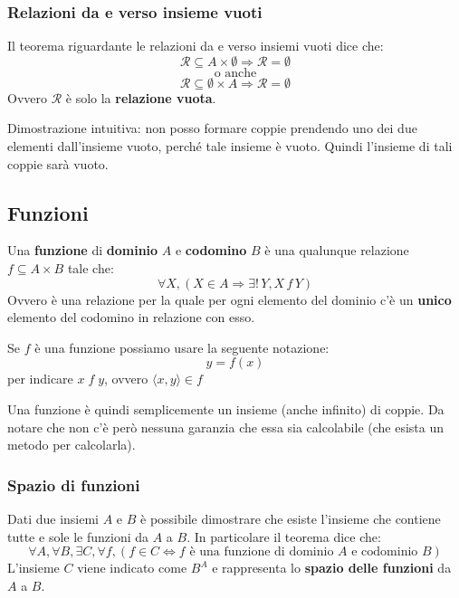 \documentclass[
  a4paper,
]{article}
\begin{document}
\hypertarget{relazioni-da-e-verso-insieme-vuoti}{%
\subsubsection{Relazioni da e verso insieme
vuoti}\label{relazioni-da-e-verso-insieme-vuoti}}

Il teorema riguardante le relazioni da e verso insiemi vuoti dice che:
\[
\mathcal{R} \subseteq A \times \emptyset \Rightarrow \mathcal{R} = \emptyset
\] \[
\text{o anche}
\] \[
\mathcal{R} \subseteq \emptyset \times A \Rightarrow \mathcal{R} = \emptyset
\] Ovvero \(\mathcal{R}\) è solo la \textbf{relazione vuota}.

Dimostrazione intuitiva: non posso formare coppie prendendo uno dei due
elementi dall'insieme vuoto, perché tale insieme è vuoto. Quindi
l'insieme di tali coppie sarà vuoto.

\hypertarget{funzioni}{%
\subsection{Funzioni}\label{funzioni}}

Una \textbf{funzione} di \textbf{dominio} \(A\) e \textbf{codomino}
\(B\) è una qualunque relazione \(f \subseteq A \times B\) tale che: \[
\forall X, (X \in A \Rightarrow \exists! \, Y, X \, f \,Y)
\] Ovvero è una relazione per la quale per ogni elemento del dominio c'è
un \textbf{unico} elemento del codomino in relazione con esso.

Se \(f\) è una funzione possiamo usare la seguente notazione: \[
y = f (x) 
\] per indicare \(x\; f\; y\), ovvero \(\langle x, y \rangle \in f\)

Una funzione è quindi semplicemente un insieme (anche infinito) di
coppie. Da notare che non c'è però nessuna garanzia che essa sia
calcolabile (che esista un metodo per calcolarla).

\hypertarget{spazio-di-funzioni}{%
\subsubsection{Spazio di funzioni}\label{spazio-di-funzioni}}

Dati due insiemi \(A\) e \(B\) è possibile dimostrare che esiste
l'insieme che contiene tutte e sole le funzioni da \(A\) a \(B\). In
particolare il teorema dice che: \[
\forall A, \forall B, \exists C, \forall f,(f \in C \iff f \text{ è una funzione di dominio } A \text{ e codominio } B)
\] L'insieme \(C\) viene indicato come \(B^A\) e rappresenta lo
\textbf{spazio delle funzioni} da \(A\) a \(B\).
\end{document}
